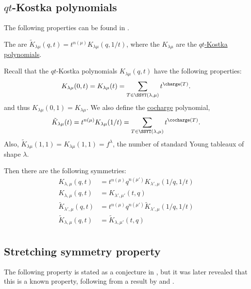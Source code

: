 \subsection[macdonaldHqtKostka]{$qt$-Kostka polynomials}

The following properties can be found in \cite[p.32]{qtCatalanBook}.

The  are
$\tilde{K}_{\lambda\mu}(q,t) = t^{n(\mu)}K_{\lambda \mu}(q,1/t)$,
where the $K_{\lambda \mu}$ are the
\hyperref[macdonaldJqtKostka]{$qt$-Kostka polynomials}.

Recall that the $qt$-Kostka polynomials $K_{\lambda \mu}(q,t)$ have the
following properties:
\[
K_{\lambda \mu}(0,t)
=
K_{\lambda \mu}(t)
=
\sum_{T \in \SSYT(\lambda,\mu)} t^{\charge(T)}.
\]
and thus $K_{\lambda \mu}(0,1) = K_{\lambda \mu}$.
We also define the \hyperref[kostkaFoulkes]{cocharge} polynomial,
\[
\tilde{K}_{\lambda \mu}(t)
=
t^{n(\mu)}K_{\lambda \mu}(1/t)
=
\sum_{T \in \SSYT(\lambda,\mu)} t^{\cocharge(T)}.
\]
Also, $\tilde{K}_{\lambda\mu}(1,1) = K_{\lambda\mu}(1,1) = f^{\lambda}$, the
number of standard Young tableaux of shape $\lambda$.

Then there are the following symmetries:
\begin{align}
K_{\lambda,\mu}(q,t) &=  t^{n(\mu)} q^{n(\mu')}  K_{\lambda',\mu}(1/q,1/t) \\
K_{\lambda,\mu}(q,t) &=   K_{\lambda',\mu'}(t,q)\\
%
\tilde{K}_{\lambda',\mu}(q,t) &=  t^{n(\mu)} q^{n(\mu')}  \tilde{K}_{\lambda',\mu}(1/q,1/t) \\
\tilde{K}_{\lambda,\mu}(q,t) &=   \tilde{K}_{\lambda,\mu'}(t,q)\\
\end{align}



\subsection[macdonaldHstretching]{Stretching symmetry property}

The following property is stated as a conjecture in \cite{LeeOhRhoades2022x},
but it was later revealed that this is a known property, following from
a result by  and 
\cite[Thm.~I.1]{GarsiaTesler1996}.

%


